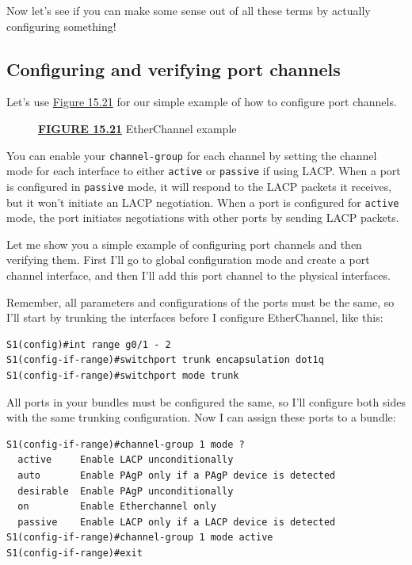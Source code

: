 \documentclass[b5paper,11pt]{memoir}
\begin{document}
Now let's see if you can make some sense out of all these terms by
actually configuring something!

\subsection{Configuring and verifying port channels}

Let's use \protect\hyperlink{c15.xhtmlux5cux23figure15-21}{Figure 15.21}
for our simple example of how to configure port channels.

\begin{figure}
\centering
\caption{{\protect\hyperlink{c15.xhtmlux5cux23figureanchor15-21}{\textbf{FIGURE
15.21}} EtherChannel example}}
\end{figure}

You can enable your
\texttt{channel-group} for each channel by setting the channel mode for
each interface to either \texttt{active} or \texttt{passive} if using
LACP. When a port is configured in \texttt{passive} mode, it will
respond to the LACP packets it receives, but it won't initiate an LACP
negotiation. When a port is configured for \texttt{active} mode, the
port initiates negotiations with other ports by sending LACP packets.

Let me show you a simple example of configuring port channels and then
verifying them. First I'll go to global configuration mode and create a
port channel interface, and then I'll add this port channel to the
physical interfaces.

Remember, all parameters and configurations of the ports must be the
same, so I'll start by trunking the interfaces before I configure
EtherChannel, like this:

\begin{verbatim}
S1(config)#int range g0/1 - 2
S1(config-if-range)#switchport trunk encapsulation dot1q
S1(config-if-range)#switchport mode trunk
\end{verbatim}

All ports in your bundles must be configured the same, so I'll configure
both sides with the same trunking configuration. Now I can assign these
ports to a bundle:

\begin{verbatim}
S1(config-if-range)#channel-group 1 mode ?
  active     Enable LACP unconditionally
  auto       Enable PAgP only if a PAgP device is detected
  desirable  Enable PAgP unconditionally
  on         Enable Etherchannel only
  passive    Enable LACP only if a LACP device is detected
S1(config-if-range)#channel-group 1 mode active
S1(config-if-range)#exit
\end{verbatim}
\end{document}
